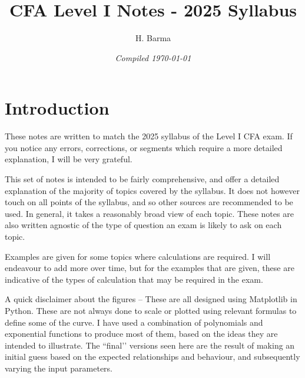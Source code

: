 \documentclass[11pt, a4paper]{article}
\numberwithin{equation}{section}
\numberwithin{figure}{section}
\numberwithin{table}{section}
\begin{document}
\begin{titlepage}
\vfill
\title{\textbf{CFA Level I Notes - 2025 Syllabus}}
\author{H. Barma}
 \date{\emph{Compiled \Datea\today}}
\maketitle
\thispagestyle{plain}
\thispagestyle{empty}
\vfill
\end{titlepage}
\clearpage



\clearpage

\section*{Introduction}
These notes are written to match the 2025 syllabus of the Level I CFA exam. If you notice any errors, corrections, or segments which require a more detailed explanation, I will be very grateful. \newline \par

This set of notes is intended to be fairly comprehensive, and offer a detailed explanation of the majority of topics covered by the syllabus. It does not however touch on all points of the syllabus, and so other sources are recommended to be used. In general, it takes a reasonably broad view of each topic. These notes are also written agnostic of the type of question an exam is likely to ask on each topic. \newline \par

Examples are given for some topics where calculations are required. I will endeavour to add more over time, but for the examples that are given, these are indicative of the types of calculation that may be required in the exam. \newline \par

A quick disclaimer about the figures -- These are all designed using Matplotlib in Python. These are not always done to scale or plotted using relevant formulas to define some of the curve. I have used a combination of polynomials and exponential functions to produce most of them, based on the ideas they are intended to illustrate. The ``final’’ versions seen here are the result of making an initial guess based on the expected relationships and behaviour, and subsequently varying the input parameters.
\clearpage

\tableofcontents
\clearpage
\end{document}
